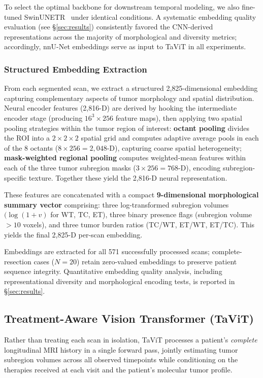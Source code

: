\documentclass[conference]{IEEEtran}
\begin{document}
To select the optimal backbone for downstream temporal modeling, we also fine-tuned SwinUNETR~\cite{tang2022swinunetr} under identical conditions. A systematic embedding quality evaluation (see \S\ref{sec:results}) consistently favored the CNN-derived representations across the majority of morphological and diversity metrics; accordingly, nnU-Net embeddings serve as input to TaViT in all experiments.

\subsubsection{Structured Embedding Extraction}
From each segmented scan, we extract a structured 2,825-dimensional embedding capturing complementary aspects of tumor morphology and spatial distribution. Neural encoder features (2,816-D) are derived by hooking the intermediate encoder stage (producing $16^3 \times 256$ feature maps), then applying two spatial pooling strategies within the tumor region of interest: \textbf{octant pooling} divides the ROI into a $2{\times}2{\times}2$ spatial grid and computes adaptive average pools in each of the 8 octants ($8 \times 256 = 2{,}048$-D), capturing coarse spatial heterogeneity; \textbf{mask-weighted regional pooling} computes weighted-mean features within each of the three tumor subregion masks ($3 \times 256 = 768$-D), encoding subregion-specific texture. Together these yield the 2,816-D neural representation.

These features are concatenated with a compact \textbf{9-dimensional morphological summary vector} comprising: three log-transformed subregion volumes $(\log(1{+}v)$ for WT, TC, ET), three binary presence flags (subregion volume $>10$ voxels), and three tumor burden ratios (TC/WT, ET/WT, ET/TC). This yields the final 2,825-D per-scan embedding.

Embeddings are extracted for all 571 successfully processed scans; complete-resection cases ($N=20$) retain zero-valued embeddings to preserve patient sequence integrity. Quantitative embedding quality analysis, including representational diversity and morphological encoding tests, is reported in \S\ref{sec:results}.


\subsection{Treatment-Aware Vision Transformer (TaViT)}

Rather than treating each scan in isolation, TaViT processes a patient's \emph{complete} longitudinal MRI history in a single forward pass, jointly estimating tumor subregion volumes across all observed timepoints while conditioning on the therapies received at each visit and the patient's molecular tumor profile.
\end{document}
